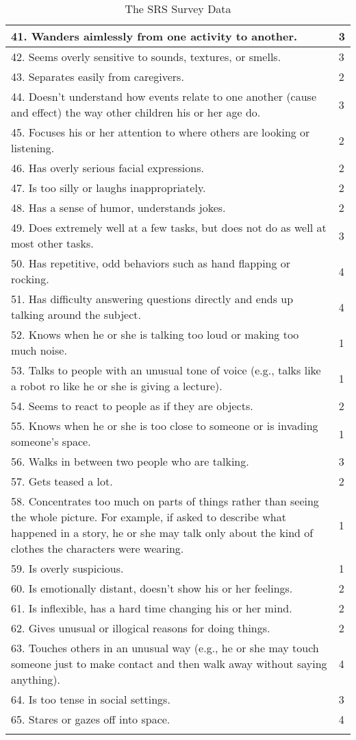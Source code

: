 \begin{appendices}
\begin{longtable}{ | p{13cm} | l | }
	41. Wanders aimlessly from one activity to another.	&	3	\\	\hline
	42. Seems overly sensitive to sounds, textures, or smells.	&	3	\\	\hline
	43. Separates easily from caregivers.	&	2	\\	\hline
	44. Doesn't understand how events relate to one another (cause and effect) the way other children his or her age do.	&	3	\\	\hline
	45. Focuses his or her attention to where others are looking or listening.	&	2	\\	\hline
	46. Has overly serious facial expressions.	&	2	\\	\hline
	47. Is too silly or laughs inappropriately.	&	2	\\	\hline
	48. Has a sense of humor, understands jokes.	&	2	\\	\hline
	49. Does extremely well at a few tasks, but does not do as well at most other tasks.	&	3	\\	\hline
	50. Has repetitive, odd behaviors such as hand flapping or rocking.	&	4	\\	\hline
	51. Has difficulty answering questions directly and ends up talking around the subject.	&	4	\\	\hline
	52. Knows when he or she is talking too loud or making too much noise.	&	1	\\	\hline
	53. Talks to people with an unusual tone of voice (e.g., talks like a robot ro like he or she is giving a lecture).	&	1	\\	\hline
	54. Seems to react to people as if they are objects.	&	2	\\	\hline
	55. Knows when he or she is too close to someone or is invading someone's space.	&	1	\\	\hline
	56. Walks in between two people who are talking.	&	3	\\	\hline
	57. Gets teased a lot.	&	2	\\	\hline
	58. Concentrates too much on parts of things rather than seeing the whole picture.  For example, if asked to describe what happened in a story, he or she may talk only about the kind of clothes the characters were wearing.	&	1	\\	\hline
	59. Is overly suspicious.	&	1	\\	\hline
	60. Is emotionally distant, doesn't show his or her feelings.	&	2	\\	\hline
	61. Is inflexible, has a hard time changing his or her mind.	&	2	\\	\hline
	62. Gives unusual or illogical reasons for doing things.	&	2	\\	\hline
	63. Touches others in an unusual way (e.g., he or she may touch someone just to make contact and then walk away without saying anything).	&	4	\\	\hline
	64. Is too tense in social settings.	&	3	\\	\hline
	65. Stares or gazes off into space.	&	4	\\	\hline
\caption{The SRS Survey Data}
\label{tab:SRSSurveyData}
\end{longtable}


\end{appendices}
